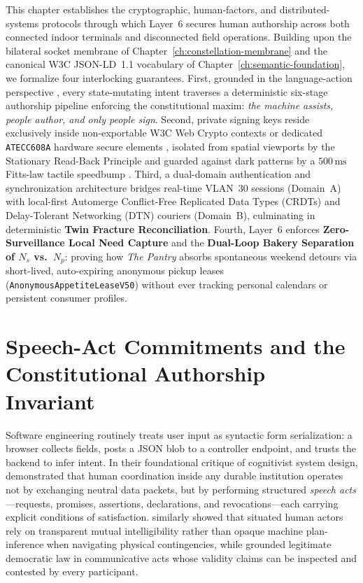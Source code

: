 This chapter establishes the cryptographic, human-factors, and distributed-systems protocols through which Layer~6 secures human authorship across both connected indoor terminals and disconnected field operations. Building upon the bilateral socket membrane of Chapter~\ref{ch:constellation-membrane} and the canonical W3C JSON-LD~1.1 vocabulary of Chapter~\ref{ch:semantic-foundation}, we formalize four interlocking guarantees. First, grounded in the language-action perspective \parencite{winograd1986understanding,habermas1996between}, every state-mutating intent traverses a deterministic six-stage authorship pipeline enforcing the constitutional maxim: \emph{the machine assists, people author, and only people sign}. Second, private signing keys reside exclusively inside non-exportable W3C Web Crypto contexts \parencite{w3c2017webcrypto} or dedicated \texttt{ATECC608A} hardware secure elements \parencite{microchip_atecc608a}, isolated from spatial viewports by the Stationary Read-Back Principle and guarded against dark patterns \parencite{gray2018darkpatterns} by a $500\,\mathrm{ms}$ Fitts-law tactile speedbump \parencite{fitts1954information,norman2013design}. Third, a dual-domain authentication and synchronization architecture bridges real-time VLAN~30 sessions (Domain~A) with local-first Automerge Conflict-Free Replicated Data Types (CRDTs) \parencite{kleppmann2017automerge,shapiro2011crdt} and Delay-Tolerant Networking (DTN) couriers \parencite{fall2003} (Domain~B), culminating in deterministic \textbf{Twin Fracture Reconciliation}. Fourth, Layer~6 enforces \textbf{Zero-Surveillance Local Need Capture} and the \textbf{Dual-Loop Bakery Separation of $N_s$ vs.\ $N_p$}: proving how \textit{The Pantry} absorbs spontaneous weekend detours via short-lived, auto-expiring anonymous pickup leases (\texttt{AnonymousAppetiteLeaseV50}) without ever tracking personal calendars or persistent consumer profiles.

\section{Speech-Act Commitments and the Constitutional Authorship Invariant}
\label{sec:speech-acts-authorship}

Software engineering routinely treats user input as syntactic form serialization: a browser collects fields, posts a JSON blob to a controller endpoint, and trusts the backend to infer intent. In their foundational critique of cognitivist system design, \textcite{winograd1986understanding} demonstrated that human coordination inside any durable institution operates not by exchanging neutral data packets, but by performing structured \emph{speech acts}---requests, promises, assertions, declarations, and revocations---each carrying explicit conditions of satisfaction. \textcite{suchman1987plans} similarly showed that situated human actors rely on transparent mutual intelligibility rather than opaque machine plan-inference when navigating physical contingencies, while \textcite{habermas1996between} grounded legitimate democratic law in communicative acts whose validity claims can be inspected and contested by every participant.

